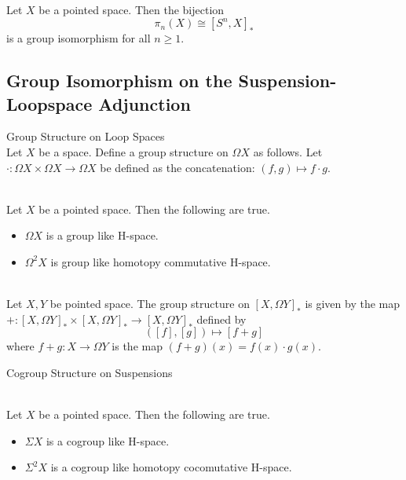 \documentclass[a4paper]{article}
\begin{document}
\begin{prp}{}{}\\
Let $X$ be a pointed space. Then the bijection $$\pi_n(X)\cong[S^n,X]_\ast$$ is a group isomorphism for all $n\geq 1$. 
\end{prp}

\subsection{Group Isomorphism on the Suspension-Loopspace Adjunction}
\begin{defn}{Group Structure on Loop Spaces}{}\\
Let $X$ be a space. Define a group structure on $\Omega X$ as follows. Let $\cdot:\Omega X\times\Omega X\to\Omega X$ be defined as the concatenation: $(f,g)\mapsto f\cdot g$. 
\end{defn}

\begin{prp}{}{}\\
Let $X$ be a pointed space. Then the following are true. 
\begin{itemize}
\item $\Omega X$ is a group like H-space. 
\item $\Omega^2X$ is group like homotopy commutative H-space. 
\end{itemize}
\end{prp}

\begin{eg}{}{}\\
Let $X,Y$ be pointed space. The group structure on $[X,\Omega Y]_\ast$ is given by the map $+:[X,\Omega Y]_\ast\times[X,\Omega Y]_\ast\to[X,\Omega Y]_\ast$ defined by $$([f],[g])\mapsto[f+g]$$ where $f+g:X\to\Omega Y$ is the map $(f+g)(x)=f(x)\cdot g(x)$. 
\end{eg}

\begin{defn}{Cogroup Structure on Suspensions}{}\\
\end{defn}

\begin{prp}{}{}\\
Let $X$ be a pointed space. Then the following are true. 
\begin{itemize}
\item $\Sigma X$ is a cogroup like H-space. 
\item $\Sigma^2X$ is a cogroup like homotopy cocomutative H-space. 
\end{itemize}
\end{prp}
\end{document}
